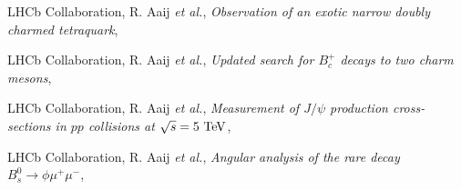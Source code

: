 \begin{cvcontent}
\begin{enumerate}[label={[\arabic*]}, leftmargin=1.5cm]
    \item LHCb Collaboration, R. Aaij \emph{et al.}, \emph{Observation of an exotic narrow doubly charmed tetraquark}, 
    \sloppy
    \item LHCb Collaboration, R. Aaij \emph{et al.}, \emph{Updated search for $B_c^+$ decays to two charm mesons}, 
    \item LHCb Collaboration, R. Aaij \emph{et al.}, \emph{Measurement of $J/\psi$ production cross-sections in $pp$ collisions at $\sqrt{s}=5~\rm{TeV}$}, 
    \sloppy
    \item LHCb Collaboration, R. Aaij \emph{et al.}, \emph{Angular analysis of the rare decay $B_s^0 \to \phi \mu^+ \mu^-$}, 
  \end{enumerate}
\end{cvcontent}